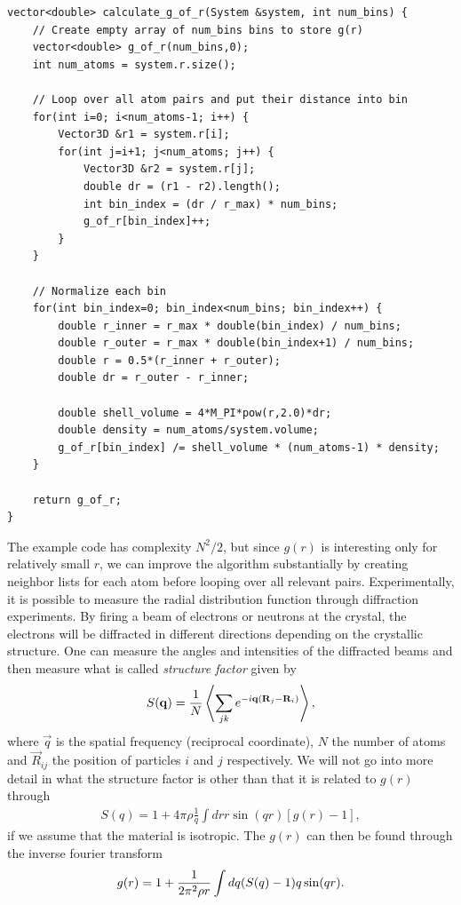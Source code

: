 \begin{lstlisting}[caption=Calculation of $g(r)$., label=lst:g_of_r]
vector<double> calculate_g_of_r(System &system, int num_bins) {
    // Create empty array of num_bins bins to store g(r)
    vector<double> g_of_r(num_bins,0);
    int num_atoms = system.r.size();

    // Loop over all atom pairs and put their distance into bin
    for(int i=0; i<num_atoms-1; i++) {
        Vector3D &r1 = system.r[i];
        for(int j=i+1; j<num_atoms; j++) {
            Vector3D &r2 = system.r[j];
            double dr = (r1 - r2).length();
            int bin_index = (dr / r_max) * num_bins;
            g_of_r[bin_index]++;
        }
    }

    // Normalize each bin
    for(int bin_index=0; bin_index<num_bins; bin_index++) {
        double r_inner = r_max * double(bin_index) / num_bins;
        double r_outer = r_max * double(bin_index+1) / num_bins;
        double r = 0.5*(r_inner + r_outer);
        double dr = r_outer - r_inner;

        double shell_volume = 4*M_PI*pow(r,2.0)*dr;
        double density = num_atoms/system.volume;
        g_of_r[bin_index] /= shell_volume * (num_atoms-1) * density;
    }

    return g_of_r;
}
\end{lstlisting}
The example code has complexity $N^2/2$, but since $g(r)$ is interesting only for relatively small $r$, we can improve the algorithm substantially by creating neighbor lists for each atom before looping over all relevant pairs. Experimentally, it is possible to measure the radial distribution function through diffraction experiments. By firing a beam of electrons or neutrons at the crystal, the electrons will be diffracted in different directions depending on the crystallic structure. One can measure the angles and intensities of the diffracted beams and then measure what is called \textit{structure factor} given by
\begin{align}
    S(\vec q) = {1\over N}\left\langle \sum_{jk} e^{-i\vec q(\vec R_j - \vec R_i)}\right \rangle,
\end{align}
where $\vec q$ is the spatial frequency (reciprocal coordinate), $N$ the number of atoms and $\vec R_{ij}$ the position of particles $i$ and $j$ respectively. We will not go into more detail in what the structure factor is other than that it is related to $g(r)$ through
\begin{align}
    S(q) = 1 + 4\pi\rho\frac{1}{q}\int dr r\sin(qr)[g(r) - 1],
\end{align}
if we assume that the material is isotropic\cite{kittel1996introduction}. The $g(r)$ can then be found through the inverse fourier transform
\begin{align}
    g(r) = 1 + {1\over 2\pi^2\rho r} \int dq(S(q) - 1)q\sin(qr).
\end{align}

